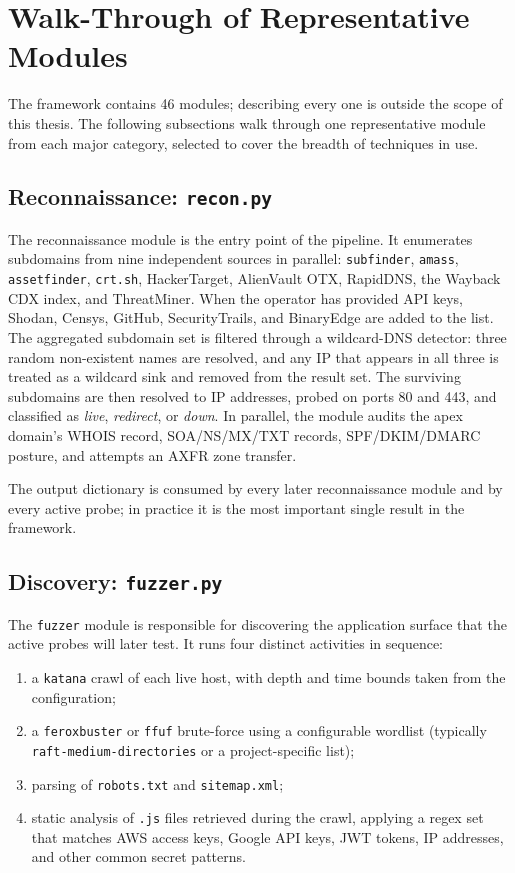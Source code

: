 \section{Walk-Through of Representative Modules}

The framework contains 46 modules; describing every one is outside the scope of this thesis. The following subsections walk through one representative module from each major category, selected to cover the breadth of techniques in use.

\subsection{Reconnaissance: \texttt{recon.py}}

The reconnaissance module is the entry point of the pipeline. It enumerates subdomains from nine independent sources in parallel: \texttt{subfinder}, \texttt{amass}, \texttt{assetfinder}, \texttt{crt.sh}, HackerTarget, AlienVault OTX, RapidDNS, the Wayback CDX index, and ThreatMiner. When the operator has provided API keys, Shodan, Censys, GitHub, SecurityTrails, and BinaryEdge are added to the list. The aggregated subdomain set is filtered through a wildcard-DNS detector: three random non-existent names are resolved, and any IP that appears in all three is treated as a wildcard sink and removed from the result set. The surviving subdomains are then resolved to IP addresses, probed on ports 80 and 443, and classified as \textit{live}, \textit{redirect}, or \textit{down}. In parallel, the module audits the apex domain's WHOIS record, SOA/NS/MX/TXT records, SPF/DKIM/DMARC posture, and attempts an AXFR zone transfer.

The output dictionary is consumed by every later reconnaissance module and by every active probe; in practice it is the most important single result in the framework.

\subsection{Discovery: \texttt{fuzzer.py}}

The \texttt{fuzzer} module is responsible for discovering the application surface that the active probes will later test. It runs four distinct activities in sequence:

\begin{enumerate}
  \item a \texttt{katana} crawl of each live host, with depth and time bounds taken from the configuration;
  \item a \texttt{feroxbuster} or \texttt{ffuf} brute-force using a configurable wordlist (typically \texttt{raft-medium-directories} or a project-specific list);
  \item parsing of \texttt{robots.txt} and \texttt{sitemap.xml};
  \item static analysis of \texttt{.js} files retrieved during the crawl, applying a regex set that matches AWS access keys, Google API keys, JWT tokens, IP addresses, and other common secret patterns.
\end{enumerate}

